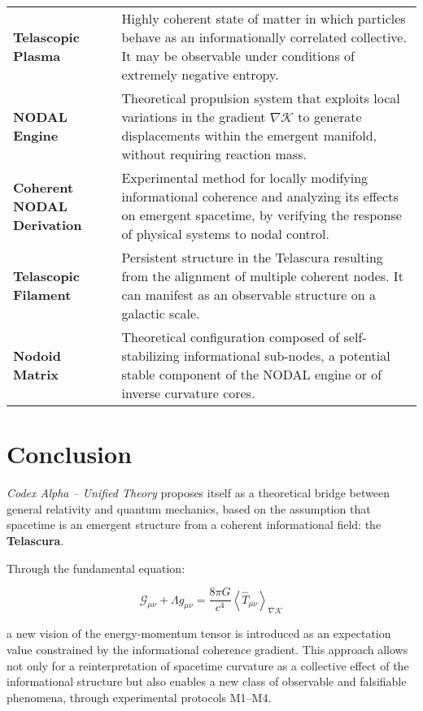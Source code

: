 \documentclass[12pt]{article}
\begin{document}
\begin{longtable}{p{4cm} p{11cm}}
\textbf{Telascopic Plasma} & Highly coherent state of matter in which particles behave as an informationally correlated collective. It may be observable under conditions of extremely negative entropy. \\

\textbf{NODAL Engine} & Theoretical propulsion system that exploits local variations in the gradient $\nabla \mathcal{K}$ to generate displacements within the emergent manifold, without requiring reaction mass. \\

\textbf{Coherent NODAL Derivation} & Experimental method for locally modifying informational coherence and analyzing its effects on emergent spacetime, by verifying the response of physical systems to nodal control. \\

\textbf{Telascopic Filament} & Persistent structure in the Telascura resulting from the alignment of multiple coherent nodes. It can manifest as an observable structure on a galactic scale. \\

\textbf{Nodoid Matrix} & Theoretical configuration composed of self-stabilizing informational sub-nodes, a potential stable component of the NODAL engine or of inverse curvature cores. \\
\bottomrule
\end{longtable}

\section*{Conclusion}

\textit{Codex Alpha – Unified Theory} proposes itself as a theoretical bridge between general relativity and quantum mechanics, based on the assumption that spacetime is an emergent structure from a coherent informational field: the \textbf{Telascura}.

Through the fundamental equation:

\[
\mathcal{G}_{\mu\nu} + \Lambda g_{\mu\nu} = \frac{8\pi G}{c^4} \left\langle \hat{T}_{\mu\nu} \right\rangle_{\nabla \mathcal{K}}
\]

a new vision of the energy-momentum tensor is introduced as an expectation value constrained by the informational coherence gradient. This approach allows not only for a reinterpretation of spacetime curvature as a collective effect of the informational structure but also enables a new class of observable and falsifiable phenomena, through experimental protocols M1–M4.
\end{document}
